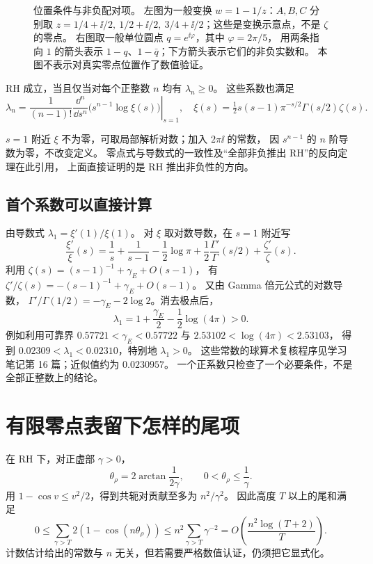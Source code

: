 \documentclass[UTF8,fontset=fandol,11pt]{ctexart}
\begin{document}
\begin{figure}[H]
\centering

\caption{位置条件与非负配对项。
左图为一般变换 $w=1-1/z$：$A,B,C$ 分别取
$z=1/4+\ii/2,\ 1/2+\ii/2,\ 3/4+\ii/2$；这些是变换示意点，不是 $\zeta$ 的零点。
右图取一般单位圆点 $q=e^{\ii\varphi}$，其中 $\varphi=2\pi/5$，
用两条指向 $1$ 的箭头表示 $1-q$、$1-\bar q$；下方箭头表示它们的非负实数和。
本图不表示对真实零点位置作了数值验证。}
\label{fig:li-circle}
\end{figure}

\begin{theorem}[Li 判据，引用]
RH 成立，当且仅当对每个正整数 $n$ 均有 $\lambda_n\ge0$。
这些系数也满足
\[
 \lambda_n=\left.
 \frac1{(n-1)!}\frac{\dd^n}{\dd s^n}
 \bigl(s^{n-1}\log\xi(s)\bigr)\right|_{s=1},
 \quad
 \xi(s)=\tfrac12s(s-1)\pi^{-s/2}\Gamma(s/2)\zeta(s).
\]
\end{theorem}
$s=1$ 附近 $\xi$ 不为零，可取局部解析对数；加入 $2\pi\ii$ 的常数，
因 $s^{n-1}$ 的 $n$ 阶导数为零，不改变定义。
零点式与导数式的一致性及“全部非负推出 RH”的反向定理在此引用，
上面直接证明的是 RH 推出非负性的方向。

\begin{samepage}
\section{首个系数可以直接计算}
由导数式 $\lambda_1=\xi'(1)/\xi(1)$。
对 $\xi$ 取对数导数，在 $s=1$ 附近写
\[
 \frac{\xi'}{\xi}(s)=\frac1s+\frac1{s-1}
 -\frac12\log\pi+\frac12\frac{\Gamma'}{\Gamma}(s/2)
 +\frac{\zeta'}{\zeta}(s).
\]
利用 $\zeta(s)=(s-1)^{-1}+\gamma_E+O(s-1)$，
有 $\zeta'/\zeta(s)=-(s-1)^{-1}+\gamma_E+O(s-1)$。
又由 Gamma 倍元公式的对数导数，
$\Gamma'/\Gamma(1/2)=-\gamma_E-2\log2$。消去极点后，
\[
 \lambda_1=1+\frac{\gamma_E}{2}-\frac12\log(4\pi)>0.
\]
例如利用可靠界
$0.57721<\gamma_E<0.57722$ 与 $2.53102<\log(4\pi)<2.53103$，
得到 $0.02309<\lambda_1<0.02310$，特别地 $\lambda_1>0$。
这些常数的球算术复核程序见学习笔记第 16 篇；近似值约为 $0.0230957$。
一个正系数只检查了一个必要条件，不是全部正整数上的结论。
\par
\end{samepage}

\section{有限零点表留下怎样的尾项}
在 RH 下，对正虚部 $\gamma>0$，
\[
 \theta_\rho=2\arctan\frac1{2\gamma},\qquad
 0<\theta_\rho\le\frac1\gamma.
\]
用 $1-\cos v\le v^2/2$，得到共轭对贡献至多为 $n^2/\gamma^2$。
因此高度 $T$ 以上的尾和满足
\[
 0\le\sum_{\gamma>T}2(1-\cos(n\theta_\rho))
 \le n^2\sum_{\gamma>T}\gamma^{-2}
 =O\left(\frac{n^2\log(T+2)}T\right).
\]
计数估计给出的常数与 $n$ 无关，但若需要严格数值认证，仍须把它显式化。
\end{document}
